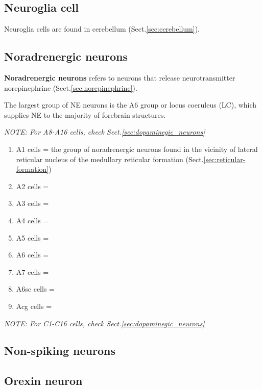 \subsection{Neuroglia cell}
\label{sec:neuroglia-cell}

Neuroglia cells are found in cerebellum (Sect.\ref{sec:cerebellum}).



\subsection{Noradrenergic neurons}
\label{sec:noradrenergic-neurons}

{\bf Noradrenergic neurons} refers to neurons that release neurotransmitter
norepinephrine (Sect.\ref{sec:norepinephrine}).

The largest group of NE neurons is the A6 group or locus coeruleus (LC), which
supplies NE to the majority of forebrain structures.

{\it NOTE: For A8-A16 cells, check Sect.\ref{sec:dopaminegic_neurons}}
\begin{enumerate}
  \item A1 cells = the group of noradrenergic neurons found in the vicinity of
  lateral reticular nucleus of the medullary reticular formation
  (Sect.\ref{sec:reticular-formation})
  
  \item A2 cells = 
  
  \item A3 cells = 
  \item A4 cells = 
  \item A5 cells = 
  \item A6 cells = 
  \item A7 cells =
  \item A6sc cells = 
  \item Acg cells =    
\end{enumerate}

{\it NOTE: For C1-C16 cells, check Sect.\ref{sec:dopaminegic_neurons}}



\subsection{Non-spiking neurons}
\label{sec:non-spiking-neurons}


\subsection{Orexin neuron}
\label{sec:orexin-neuron}

